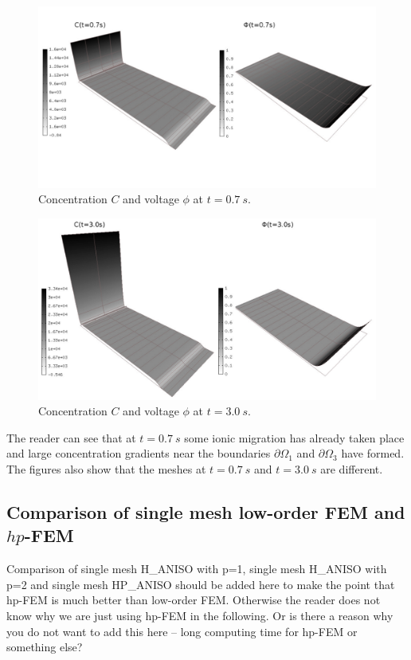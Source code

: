\begin{figure}[!ht]
  \begin{centering}
  \includegraphics[width=.75\columnwidth]{cphi-1}
  \caption{\label{fig:cphi-1} Concentration $C$
  and voltage $\phi$ at $t=0.7\ s$.}
  \end{centering}
\end{figure}

\newpage

\begin{figure}[!ht]
  \begin{centering}
  \includegraphics[width=.75\columnwidth]{cphi-2}
  \caption{\label{fig:cphi-2} Concentration $C$
  and voltage $\phi$ at $t=3.0\ s$.}
  \end{centering}
\end{figure}

The reader can see that at $t=0.7\ s$ some ionic migration has already 
taken place and large concentration gradients near the boundaries $\partial\Omega_1$ 
and $\partial\Omega_3$ have formed. The figures also show that the meshes 
at $t=0.7\ s$ and $t=3.0\ s$ are different. 

\subsection{Comparison of single mesh low-order FEM and $hp$-FEM}

Comparison of single mesh H\_ANISO with p=1, single mesh H\_ANISO with p=2
and single mesh HP\_ANISO should be added here to make the point that 
hp-FEM is much better than low-order FEM. 
Otherwise the reader does not know 
why we are just using hp-FEM in the following. Or is there a reason 
why you do not want to add this here --  long computing time for hp-FEM or something 
else?

